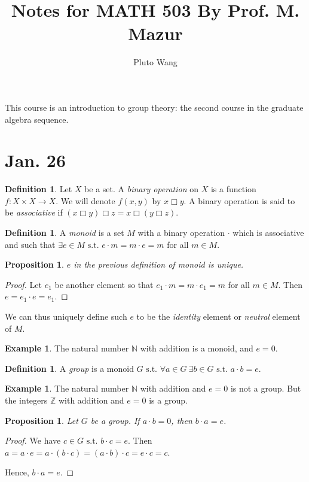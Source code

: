 \documentclass{amsart}
\newtheorem{prop}[thm]{Proposition}
\theoremstyle{definition}
\newtheorem{definition}[thm]{Definition}
\newtheorem{example}[thm]{Example}
\newcommand{\N}{\mathbb N}
\newcommand{\Z}{\mathbb Z}
\newcommand{\st}{\text{ s.t. }}
\begin{document}
\title{Notes for MATH 503 By Prof. M. Mazur}
\author{Pluto Wang}
\maketitle
\tableofcontents
This course is an introduction to group theory: the second course in the graduate algebra sequence.
\section{Jan. 26}
\begin{definition}
	Let $X$ be a set. A \emph{binary operation} on $X$ is a function $f:X\times X\to X$. We will denote $f(x,y)$ by $x\Box y$. A binary operation is said to be \emph{associative} if $(x\Box y)\Box z=x\Box(y\Box z)$.
\end{definition}
\begin{definition}
	A \emph{monoid} is a set $M$ with a binary operation $\cdot$ which is associative and such that $\exists e\in M\st e\cdot m=m\cdot e=m$ for all $m\in M$.
\end{definition}
\begin{prop}
	$e$ in the previous definition of monoid is unique.
\end{prop}
\begin{proof}
	Let $e_1$ be another element so that $e_1\cdot m=m\cdot e_1=m$ for all $m\in M$. Then $e=e_1\cdot e=e_1$.
\end{proof}
We can thus uniquely define such $e$ to be the \emph{identity} element or \emph{neutral} element of $M$.
\begin{example}
	The natural number $\N$ with addition is a monoid, and $e=0$.
\end{example}
\begin{definition}
	A \emph{group} is a monoid $G\st\forall a\in G\ \exists b\in G\st a\cdot b=e$.
\end{definition}
\begin{example}
	The natural number $\N$ with addition and $e=0$ is not a group. But the integers $\Z$ with addition and $e=0$ is a group.
\end{example}
\begin{prop}
	Let $G$ be a group. If $a\cdot b=0$, then $b\cdot a=e$.
\end{prop}
\begin{proof}
	We have $c\in G\st b\cdot c=e$. Then $a=a\cdot e=a\cdot(b\cdot c)=(a\cdot b)\cdot c=e\cdot c=c$.
	
	Hence, $b\cdot a=e$.
\end{proof}
\end{document}
